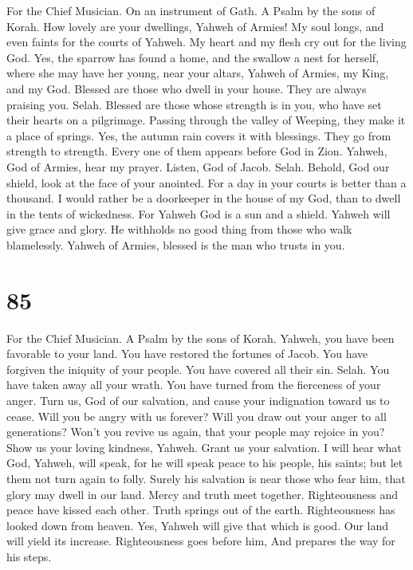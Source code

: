 For the Chief Musician. On an instrument of Gath. A Psalm by the sons of
Korah.  How lovely are your dwellings, Yahweh of Armies!
 My soul longs, and even faints for the courts of Yahweh. My
heart and my flesh cry out for the living God.  Yes, the
sparrow has found a home, and the swallow a nest for herself, where she
may have her young, near your altars, Yahweh of Armies, my King, and my
God.  Blessed are those who dwell in your house. They are
always praising you. Selah.  Blessed are those whose
strength is in you, who have set their hearts on a pilgrimage.
 Passing through the valley of Weeping, they make it a place
of springs. Yes, the autumn rain covers it with blessings. 
They go from strength to strength. Every one of them appears before God
in Zion.  Yahweh, God of Armies, hear my prayer. Listen, God
of Jacob. Selah.  Behold, God our shield, look at the face
of your anointed.  For a day in your courts is better than
a thousand. I would rather be a doorkeeper in the house of my God, than
to dwell in the tents of wickedness.  For Yahweh God is a
sun and a shield. Yahweh will give grace and glory. He withholds no good
thing from those who walk blamelessly.  Yahweh of Armies,
blessed is the man who trusts in you.

\hypertarget{section-75}{%
\section{85}\label{section-75}}

For the Chief Musician. A Psalm by the sons of Korah. 
Yahweh, you have been favorable to your land. You have restored the
fortunes of Jacob.  You have forgiven the iniquity of your
people. You have covered all their sin. Selah.  You have
taken away all your wrath. You have turned from the fierceness of your
anger.  Turn us, God of our salvation, and cause your
indignation toward us to cease.  Will you be angry with us
forever? Will you draw out your anger to all generations? 
Won't you revive us again, that your people may rejoice in you?
 Show us your loving kindness, Yahweh. Grant us your
salvation.  I will hear what God, Yahweh, will speak, for he
will speak peace to his people, his saints; but let them not turn again
to folly.  Surely his salvation is near those who fear him,
that glory may dwell in our land.  Mercy and truth meet
together. Righteousness and peace have kissed each other. 
Truth springs out of the earth. Righteousness has looked down from
heaven.  Yes, Yahweh will give that which is good. Our land
will yield its increase.  Righteousness goes before him,
And prepares the way for his steps.

